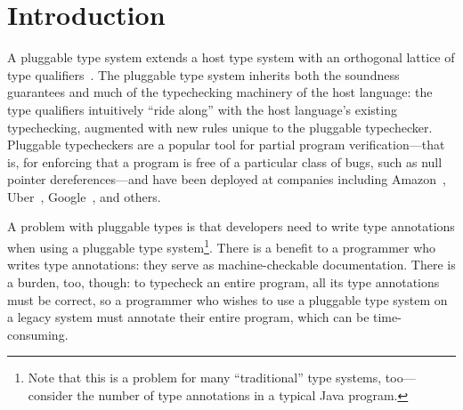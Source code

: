 \section{Introduction}
\label{sec:intro}


A pluggable type system extends a host type system with an orthogonal
lattice of type qualifiers~\cite{FosterFFA99}.
The pluggable type system inherits both the soundness guarantees
and much of the typechecking machinery of the host language:
the type qualifiers intuitively ``ride along'' with the host
language's existing typechecking, augmented with new rules
unique to the pluggable typechecker.
Pluggable typecheckers are a popular tool for partial program
verification---that is, for enforcing that a program is free
of a particular class of bugs, such as null pointer dereferences---and
have been deployed at companies including Amazon~\cite{KelloggRSSE2020},
Uber~, Google~, and others.

A problem with pluggable types %
is that developers need to write type annotations when using a pluggable type
system\footnote{Note that this is a problem for many ``traditional'' type systems,
too---consider the number of type annotations in \eg a typical Java program.}.
There is a benefit to a programmer who writes type annotations: they serve as machine-checkable
documentation.
There is a burden, too, though: to typecheck an entire program, all its type annotations
must be correct, so a programmer who wishes to use a pluggable type system
on a legacy system must annotate their entire program, which can be time-consuming.


